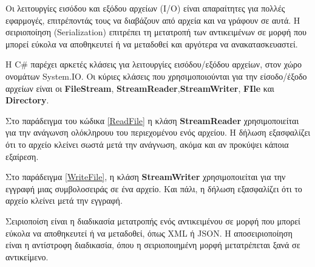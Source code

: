 Οι λειτουργίες εισόδου και εξόδου αρχείων (I/O) είναι απαραίτητες για πολλές εφαρμογές, επιτρέποντάς τους να διαβάζουν από αρχεία και να γράφουν σε αυτά. 
Η σειριοποίηση (Serialization) επιτρέπει τη μετατροπή των αντικειμένων σε μορφή που μπορεί εύκολα να αποθηκευτεί ή να μεταδοθεί και αργότερα να ανακατασκευαστεί.

H C\# παρέχει αρκετές κλάσεις για λειτουργίες εισόδου/εξόδου αρχείων, στον χώρο ονομάτων System.IO. 
Οι κύριες κλάσεις που χρησιμοποιούνται για την είσοδο/έξοδο αρχείων είναι οι \textbf{FileStream}, \textbf{StreamReader},\textbf{StreamWriter}, \textbf{FIle} και \textbf{Directory}.

Στο παράδειγμα του κώδικα \ref{ReadFile} η κλάση \textbf{StreamReader} χρησιμοποιείται για την ανάγωνση ολόκληρουυ του περιεχομένου ενός αρχείου. 
Η δήλωση  εξασφαλίζει ότι το αρχείο κλείνει σωστά μετά την ανάγνωση, ακόμα και αν προκύψει κάποια εξαίρεση.

Στο παράδειγμα \ref{WriteFile}, η κλάση \textbf{StreamWriter} χρησιμοποιείται για την εγγραφή μιας συμβολοσειράς σε ένα αρχείο. Και πάλι, η δήλωση  εξασφαλίζει ότι το αρχείο κλείνει μετά την εγγραφή.




Σειριοποίση είναι η διαδικασία μετατροπής ενός αντικειμένου σε μορφή που μπορεί εύκολα να αποθηκευτεί ή να μεταδοθεί, όπως XML ή JSON.
H αποσειριοποίηση είναι η αντίστροφη διαδικασία, όπου η σειριοποιημένη μορφή μετατρέπεται ξανά σε αντικείμενο.


